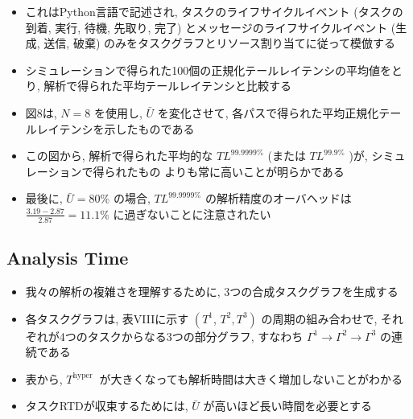 \begin{frame}{}
    \begin{itemize}
        \item これはPython言語で記述され, タスクのライフサイクルイベント (タスクの到着, 実行, 待機, 先取り, 完了) とメッセージのライフサイクルイベント (生成, 送信, 破棄) のみをタスクグラフとリソース割り当てに従って模倣する
\item シミュレーションで得られた100個の正規化テールレイテンシの平均値をとり, 解析で得られた平均テールレイテンシと比較する
\item 図8は, $N=8$ を使用し, $\bar{U}$ を変化させて, 各パスで得られた平均正規化テールレイテンシを示したものである
\item この図から, 解析で得られた平均的な $T L^{99.9999 \%}$  (または $T L^{99.9 \%}$ )が, シミュレーションで得られたもの よりも常に高いことが明らかである
\item 最後に,  $\bar{U}=80 \%$ の場合,  $T L^{99.9999 \%}$ の解析精度のオーバヘッドは $\frac{3.19-2.87}{2.87}=11.1 \%$ に過ぎないことに注意されたい
    \end{itemize}
\end{frame}


\subsection{Analysis Time}
\label{ssec: analysis time}

\begin{frame}{}
    \begin{itemize}
        \item 我々の解析の複雑さを理解するために, 3つの合成タスクグラフを生成する
\item 各タスクグラフは, 表VIIIに示す $\left(T^{1}\right.$, $\left.T^{2}, T^{3}\right)$ の周期の組み合わせで, それぞれが4つのタスクからなる3つの部分グラフ, すなわち $\Gamma^{1} \rightarrow \Gamma^{2} \rightarrow \Gamma^{3}$ の連続である
    \end{itemize}
\end{frame}

\begin{frame}{}
    \begin{itemize}
        \item 表から, $T^{\text {hyper }}$ が大きくなっても解析時間は大きく増加しないことがわかる
\item タスクRTDが収束するためには, $\bar{U}$ が高いほど長い時間を必要とする
    \end{itemize}
\end{frame}

